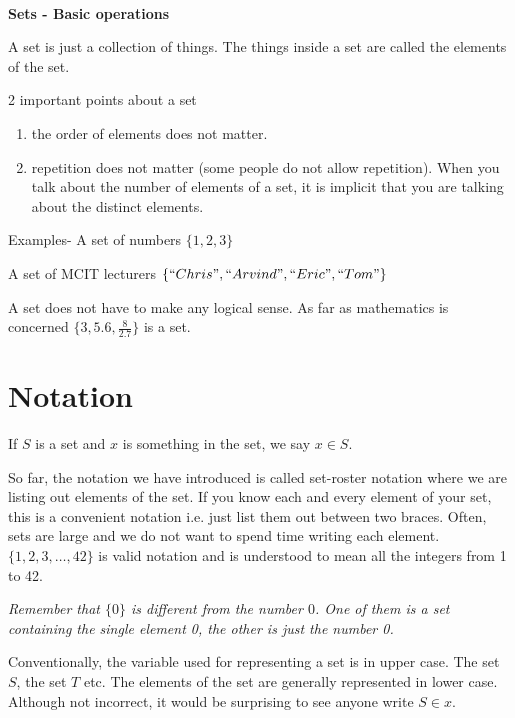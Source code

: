 \documentclass[12pt]{article}
\begin{document}
\begin{center}
\\
\vspace{1cm}
\end{center}


\medskip\noindent
	

{\bf Sets - Basic operations}

A set is just a collection of things. The things inside a set are called the elements of the set.

2 important points about a set

\begin{enumerate}
\item the order of elements does not matter.
\item repetition does not matter (some people do not allow repetition). When you talk about the number of elements of a set, it is implicit that you are talking about the distinct elements.
\end{enumerate}

Examples- 
A set of numbers $\{1,2,3\}$

A set of MCIT lecturers $\{``Chris", ``Arvind", ``Eric", ``Tom"\}$

A set does not have to make any logical sense. As far as mathematics is concerned $\{3, 5.6, \frac{8}{2.7}\}$ is a set.

\section*{Notation}

If $S$ is a set and $x$ is something in the set, we say $x \in S$.

So far, the notation we have introduced is called set-roster notation where we are listing out elements of the set. If you know each and every element of your set, this is a convenient notation i.e. just list them out between two braces. Often, sets are large and we do not want to spend time writing each element. $\{1,2,3,\ldots,42\}$ is valid notation and is understood to mean all the integers from 1 to 42.

\bigskip

\emph{Remember that $\{0\}$ is different from the number $0$. One of them is a set containing the single element 0, the other is just the number 0. }

\bigskip

Conventionally, the variable used for representing a set is in upper case. The set $S$, the set $T$ etc. The elements of the set are generally represented in lower case. Although not incorrect, it would be surprising to see anyone write $S \in x$.  
\end{document}
